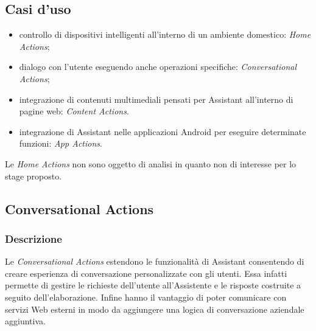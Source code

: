 	\subsection{Casi d'uso}
	\begin{itemize}
		\item controllo di dispositivi intelligenti all'interno di un ambiente domestico: \textit{Home Actions};
		\item dialogo con l'utente eseguendo anche operazioni specifiche: \textit{Conversational Actions};
		\item integrazione di contenuti multimediali pensati per Assistant all'interno di pagine web: \textit{Content Actions}.
		\item integrazione di Assistant nelle applicazioni Android per eseguire determinate funzioni: \textit{App Actions}.
	\end{itemize}
	Le \textit{Home Actions} non sono oggetto di analisi in quanto non di interesse per lo stage proposto.
	\subsection{Conversational Actions}
		\subsubsection{Descrizione}
		Le \textit{Conversational Actions} estendono le funzionalità di Assistant consentendo di creare esperienza di conversazione personalizzate con gli utenti. Essa infatti permette di gestire le richieste dell'utente all'Assistente e le risposte costruite a seguito dell'elaborazione. Infine hanno il vantaggio di poter comunicare con servizi Web esterni in modo da aggiungere una logica di conversazione aziendale aggiuntiva.
